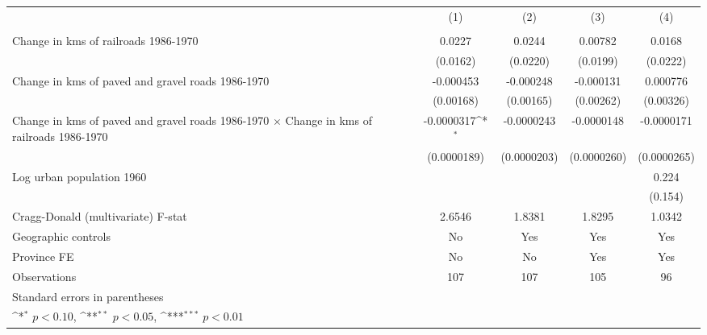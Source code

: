 {
\def\sym#1{\ifmmode^{#1}\else\(^{#1}\)\fi}
\begin{tabular}{l*{4}{c}}
\hline\hline
                &\multicolumn{1}{c}{(1)}&\multicolumn{1}{c}{(2)}&\multicolumn{1}{c}{(3)}&\multicolumn{1}{c}{(4)}\\
                &\multicolumn{1}{c}{}&\multicolumn{1}{c}{}&\multicolumn{1}{c}{}&\multicolumn{1}{c}{}\\
\hline
Change in kms of railroads 1986-1970&   0.0227         &   0.0244         &  0.00782         &   0.0168         \\
                & (0.0162)         & (0.0220)         & (0.0199)         & (0.0222)         \\
[1em]
Change in kms of paved and gravel roads 1986-1970&-0.000453         &-0.000248         &-0.000131         & 0.000776         \\
                &(0.00168)         &(0.00165)         &(0.00262)         &(0.00326)         \\
[1em]
Change in kms of paved and gravel roads 1986-1970 $\times$ Change in kms of railroads 1986-1970&-0.0000317\sym{*}  &-0.0000243         &-0.0000148         &-0.0000171         \\
                &(0.0000189)         &(0.0000203)         &(0.0000260)         &(0.0000265)         \\
[1em]
Log urban population 1960&                  &                  &                  &    0.224         \\
                &                  &                  &                  &  (0.154)         \\
\hline
Cragg-Donald (multivariate) F-stat&   2.6546         &   1.8381         &   1.8295         &   1.0342         \\
Geographic controls&       No         &      Yes         &      Yes         &      Yes         \\
Province FE     &       No         &       No         &      Yes         &      Yes         \\
Observations    &      107         &      107         &      105         &       96         \\
\hline\hline
\multicolumn{5}{l}{\footnotesize Standard errors in parentheses}\\
\multicolumn{5}{l}{\footnotesize \sym{*} \(p<0.10\), \sym{**} \(p<0.05\), \sym{***} \(p<0.01\)}\\
\end{tabular}
}
